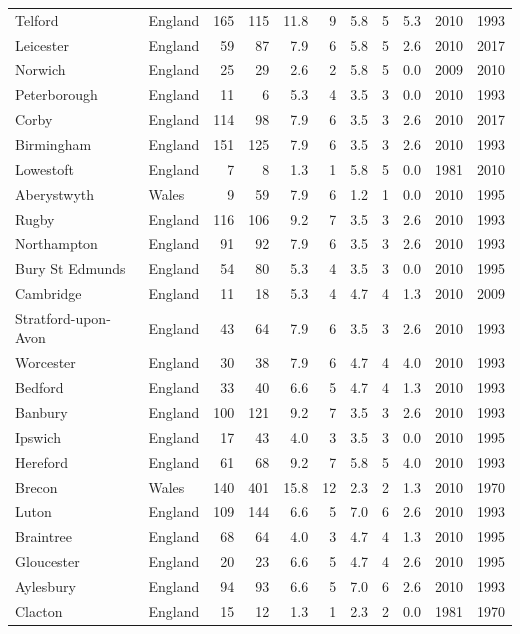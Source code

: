 \documentclass[11pt,a4paper]{article}
\begin{document}
{\begin{longtable}{llrrrrrrrrr}
Telford & England & 165 & 115 & 11.8 & 9 & 5.8 & 5 & 5.3 & 2010 & 1993\\
Leicester & England & 59 & 87 & 7.9 & 6 & 5.8 & 5 & 2.6 & 2010 & 2017\\
Norwich & England & 25 & 29 & 2.6 & 2 & 5.8 & 5 & 0.0 & 2009 & 2010\\
Peterborough & England & 11 & 6 & 5.3 & 4 & 3.5 & 3 & 0.0 & 2010 & 1993\\
Corby & England & 114 & 98 & 7.9 & 6 & 3.5 & 3 & 2.6 & 2010 & 2017\\
Birmingham & England & 151 & 125 & 7.9 & 6 & 3.5 & 3 & 2.6 & 2010 & 1993\\
Lowestoft & England & 7 & 8 & 1.3 & 1 & 5.8 & 5 & 0.0 & 1981 & 2010\\
Aberystwyth & Wales & 9 & 59 & 7.9 & 6 & 1.2 & 1 & 0.0 & 2010 & 1995\\
Rugby & England & 116 & 106 & 9.2 & 7 & 3.5 & 3 & 2.6 & 2010 & 1993\\
Northampton & England & 91 & 92 & 7.9 & 6 & 3.5 & 3 & 2.6 & 2010 & 1993\\
Bury St Edmunds & England & 54 & 80 & 5.3 & 4 & 3.5 & 3 & 0.0 & 2010 & 1995\\
Cambridge & England & 11 & 18 & 5.3 & 4 & 4.7 & 4 & 1.3 & 2010 & 2009\\
Stratford-upon-Avon & England & 43 & 64 & 7.9 & 6 & 3.5 & 3 & 2.6 & 2010 & 1993\\
Worcester & England & 30 & 38 & 7.9 & 6 & 4.7 & 4 & 4.0 & 2010 & 1993\\
Bedford & England & 33 & 40 & 6.6 & 5 & 4.7 & 4 & 1.3 & 2010 & 1993\\
Banbury & England & 100 & 121 & 9.2 & 7 & 3.5 & 3 & 2.6 & 2010 & 1993\\
Ipswich & England & 17 & 43 & 4.0 & 3 & 3.5 & 3 & 0.0 & 2010 & 1995\\
Hereford & England & 61 & 68 & 9.2 & 7 & 5.8 & 5 & 4.0 & 2010 & 1993\\
Brecon & Wales & 140 & 401 & 15.8 & 12 & 2.3 & 2 & 1.3 & 2010 & 1970\\
Luton & England & 109 & 144 & 6.6 & 5 & 7.0 & 6 & 2.6 & 2010 & 1993\\
Braintree & England & 68 & 64 & 4.0 & 3 & 4.7 & 4 & 1.3 & 2010 & 1995\\
Gloucester & England & 20 & 23 & 6.6 & 5 & 4.7 & 4 & 2.6 & 2010 & 1995\\
Aylesbury & England & 94 & 93 & 6.6 & 5 & 7.0 & 6 & 2.6 & 2010 & 1993\\
Clacton & England & 15 & 12 & 1.3 & 1 & 2.3 & 2 & 0.0 & 1981 & 1970\\

\end{longtable}}
\end{document}
